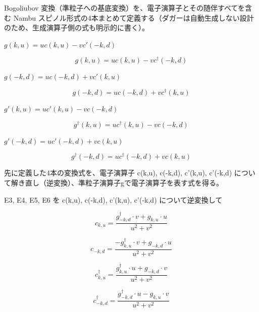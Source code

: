 \documentclass[dvipdfmx,a4paper,11pt]{jsarticle}
\begin{document}
Bogoliubov 変換（準粒子への基底変換）を、電子演算子とその随伴すべてを含む Nambu スピノル形式の4本まとめて定義する（ダガーは自動生成しない設計のため、生成演算子側の式も明示的に書く）。

$g(k,u) = u c(k,u) - v c'(-k,d)$

\begin{equation}
  g(k,u) = u c(k,u) - v c^{\dagger}(-k,d)
  \label{eq:E3}
\end{equation}

$g(-k,d) = u c(-k,d) + v c'(k,u)$

\begin{equation}
  g(-k,d) = u c(-k,d) + v c^{\dagger}(k,u)
  \label{eq:E4}
\end{equation}

$g'(k,u) = u c'(k,u) - v c(-k,d)$

\begin{equation}
  g^{\dagger}(k,u) = u c^{\dagger}(k,u) - v c(-k,d)
  \label{eq:E5}
\end{equation}

$g'(-k,d) = u c'(-k,d) + v c(k,u)$

\begin{equation}
  g^{\dagger}(-k,d) = u c^{\dagger}(-k,d) + v c(k,u)
  \label{eq:E6}
\end{equation}

先に定義した4本の変換式を、電子演算子 c(k,u), c(-k,d), c'(k,u), c'(-k,d) について解き直し（逆変換）、準粒子演算子gで電子演算子を表す式を得る。

E3, E4, E5, E6 を c(k,u), c(-k,d), c'(k,u), c'(-k,d) について逆変換して

\begin{equation}
  c_{k,u} = \frac{g^{\dagger}_{-k,d} \cdot v + g_{k,u} \cdot u}{u^{2} + v^{2}}
  \label{eq:E7}
\end{equation}

\begin{equation}
  c_{-k,d} = \frac{ - g^{\dagger}_{k,u} \cdot v + g_{-k,d} \cdot u}{u^{2} + v^{2}}
  \label{eq:E8}
\end{equation}

\begin{equation}
  c^{\dagger}_{k,u} = \frac{g^{\dagger}_{k,u} \cdot u + g_{-k,d} \cdot v}{u^{2} + v^{2}}
  \label{eq:E9}
\end{equation}

\begin{equation}
  c^{\dagger}_{-k,d} = \frac{g^{\dagger}_{-k,d} \cdot u - g_{k,u} \cdot v}{u^{2} + v^{2}}
  \label{eq:E10}
\end{equation}
\end{document}
